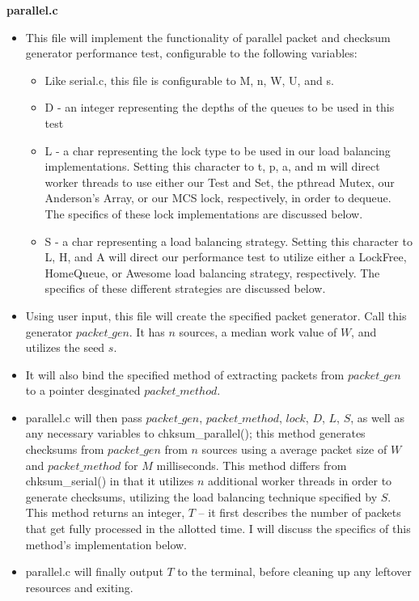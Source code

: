 \documentclass[]{article}
\begin{document}
\begin{itemize}
	\textbf{parallel.c}
	\begin{itemize}
		\item This file will implement the functionality of parallel packet and checksum generator performance test, configurable to the following variables:
		\begin{itemize}
			\item Like serial.c, this file is configurable to M, n, W, U, and s.
			\item D - an integer representing the depths of the queues to be used in this test
			\item L - a char representing the lock type to be used in our load balancing implementations. Setting this character to t, p, a, and m will direct worker threads to use either our Test and Set, the pthread Mutex, our Anderson's Array, or our MCS lock, respectively, in order to dequeue. The specifics of these lock implementations are discussed below.
			\item S - a char representing a load balancing strategy. Setting this character to L, H, and A will direct our performance test to utilize either a LockFree, HomeQueue, or Awesome load balancing strategy, respectively. The specifics of these different strategies are discussed below.
		\end{itemize}
		\item Using user input, this file will create the specified packet generator. Call this generator $packet\_gen$. It has $n$ sources, a median work value of $W$, and utilizes the seed $s$. 
		\item It will also bind the specified method of extracting packets from $packet\_gen$ to a pointer desginated $packet\_method$. 
		\item parallel.c will then pass $packet\_gen$, $packet\_method$, $lock$, $D$, $L$, $S$, as well as any necessary variables to chksum\_parallel(); this method generates checksums from $packet\_gen$ from $n$ sources using a average packet size of $W$ and $packet\_method$ for $M$ milliseconds. This method differs from chksum\_serial() in that it utilizes $n$ additional worker threads in order to generate checksums, utilizing the load balancing technique specified by $S$. This method returns an integer, $T$ -- it first describes the number of packets that get fully processed in the allotted time. I will discuss the specifics of this method's implementation below. 
		\item parallel.c will finally output $T$ to the terminal, before cleaning up any leftover resources and exiting.

\end{itemize}
\end{itemize}
\end{document}
